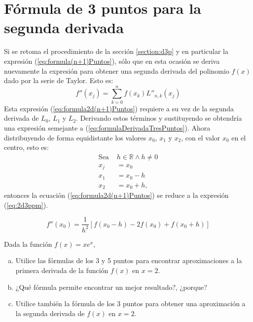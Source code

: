 \section{Fórmula de 3 puntos para la segunda derivada}
Si se retoma el procedimiento de la sección \ref{section:d3p} y en particular la expresión (\ref{eq:formula(n+1)Puntos}), sólo
que en esta ocasión se deriva nuevamente la expresión para obtener una segunda derivada del polinomio $f(x)$ dado por la serie 
de Taylor. Esto es:
\begin{equation}
	f''(x_j) = \sum_{k=0}^n f(x_k)L''_{n,k}(x_j)
	\label{eq:formula2d(n+1)Puntos} 
\end{equation}
Esta expresión (\ref{eq:formula2d(n+1)Puntos}) requiere a su vez de la segunda derivada de $L_0$, $L_1$ y $L_2$. Derivando estos
términos y sustituyendo se obtendría una expresión semejante a (\ref{eq:formulaDerivadaTresPuntos}). Ahora distribuyendo de 
forma equidistante los valores $x_0$, $x_1$ y $x_2$, con el valor $x_0$ en el centro, esto es:
\begin{align*}
	\mbox{Sea }& h\in\mathbb{R} \wedge h\not=0 \\
	x_j &= x_0\\
	x_1 &= x_0 - h \\ 
	x_2 &= x_0 + h,
\end{align*}
entonces la ecuación (\ref{eq:formula2d(n+1)Puntos}) se reduce a la expresión (\ref{eq:2d3ppm}).
\begin{definitionT}
	\begin{equation}
		f''(x_0) = \frac{1}{h^2}\left[f(x_0-h) - 2f(x_0) + f(x_0+h)\right] 
		\label{eq:2d3ppm}
	\end{equation}
\end{definitionT}


\begin{exerciseT}
	Dada la función $f(x) = xe^x$, 
		\begin{enumerate}[a)]
			\item Utilice las fórmulas de los 3 y 5 puntos para encontrar aproximaciones a la primera derivada de 
				la función $f(x)$ en $x=2$. 
			\item ¿Qué fórmula permite encontrar un mejor resultado?, ¿porque?
			\item Utilice también la fórmula de los 3 puntos para obtener una aproximación a la segunda derivada de $f(x)$ en $x=2$.
		\end{enumerate}	
	
\end{exerciseT}


